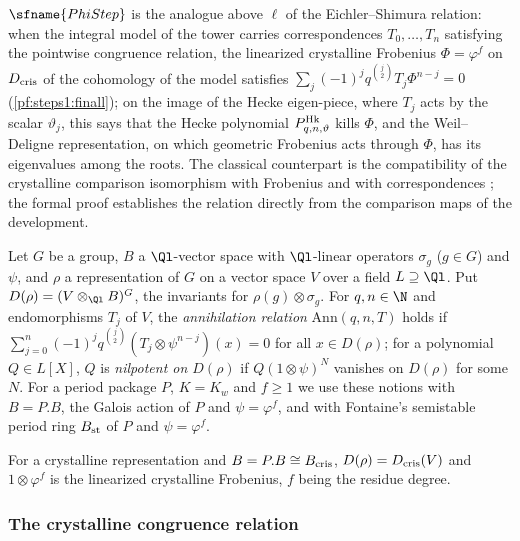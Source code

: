$\sfname{PhiStep}$ is the analogue above $\ell$ of the Eichler--Shimura relation: when the integral model of the tower
carries correspondences $T_0,\dots,T_n$ satisfying the pointwise congruence relation, the linearized crystalline
Frobenius $\Phi=\varphi^f$ on $D_{\mathrm{cris}}$ of the cohomology of the model satisfies
$\sum_j(-1)^jq^{\binom j2}T_j\Phi^{n-j}=0$ (\cref{pf:steps1:finall}); on the image of the Hecke eigen-piece, where
$T_j$ acts by the scalar $\vartheta_j$, this says that the Hecke polynomial $P^{\mathrm{Hk}}_{q,n,\vartheta}$ kills $\Phi$, and
the Weil--Deligne representation, on which geometric Frobenius acts through $\Phi$, has its eigenvalues among the
roots. The classical counterpart is the compatibility of the crystalline comparison isomorphism with Frobenius and
with correspondences \cite{Faltings1989,FaltingsChai1990}; the formal proof establishes the relation directly from the
comparison maps of the development.

\begin{definition}\label{pf:steps1:def:annd}
Let $G$ be a group, $B$ a $\Ql$-vector space with $\Ql$-linear operators $\sigma_g$ ($g\in G$) and $\psi$, and $\rho$ a
representation of $G$ on a vector space $V$ over a field $L\supseteq\Ql$. Put $D(\rho)=(V\otimes_{\Ql}B)^G$, the
invariants for $\rho(g)\otimes\sigma_g$. For $q,n\in\N$ and endomorphisms $T_j$ of $V$, the \emph{annihilation
relation} $\mathrm{Ann}(q,n,T)$ holds if $\sum_{j=0}^n(-1)^jq^{\binom j2}(T_j\otimes\psi^{n-j})(x)=0$ for all $x\in
D(\rho)$; for a polynomial $Q\in L[X]$, $Q$ is \emph{nilpotent on $D(\rho)$} if $Q(1\otimes\psi)^N$ vanishes on $D(\rho)$
for some $N$. For a period package $P$, $K=K_w$ and $f\ge1$ we use these notions with $B=P.B$, the Galois action of
$P$ and $\psi=\varphi^f$, and with Fontaine's semistable period ring $B_{\mathrm{st}}$ of $P$ and $\psi=\varphi^f$.
 
\end{definition}

For a crystalline representation and $B=P.B\cong B_{\mathrm{cris}}$, $D(\rho)=D_{\mathrm{cris}}(V)$ and $1\otimes\varphi^f$ is the
linearized crystalline Frobenius, $f$ being the residue degree.

\subsubsection{The crystalline congruence relation}

